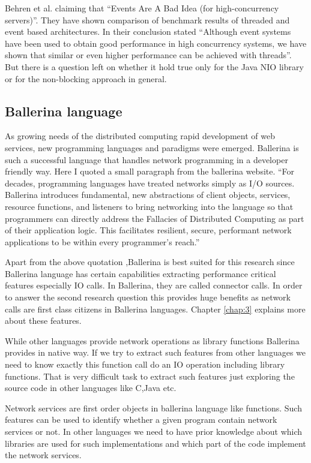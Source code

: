 Behren et al. \cite{events_are_bad} claiming that “Events Are A Bad Idea (for high-concurrency servers)”. They have shown comparison of benchmark results of threaded and event based architectures. In their conclusion stated “Although event systems have been used to obtain good performance in high concurrency systems, we have shown that similar or even higher performance can be achieved with threads”. But there is a question left on whether it hold true only for the Java \acrshort{NIO} library or for the non-blocking approach in general.

\subsection{Ballerina language}

As growing needs of the distributed computing rapid development of web services, new programming
languages and paradigms were emerged. Ballerina \cite{ballerina} is such a successful language that handles
network programming in a developer friendly way. Here I quoted a small paragraph from the ballerina
website.
“For decades, programming languages have treated networks simply as I/O sources. Ballerina
introduces fundamental, new abstractions of client objects, services, resource functions, and listeners
to bring networking into the language so that programmers can directly address the Fallacies \cite{fallacies_of_distributed_computing} of
Distributed Computing as part of their application logic. This facilitates resilient, secure, performant
network applications to be within every programmer’s reach.”

Apart from the above quotation ,Ballerina is best suited for this research since Ballerina language has certain capabilities extracting performance critical features especially IO calls. In Ballerina, they are called connector calls. In order to answer the second research question this provides huge benefits as network calls are first
class citizens in Ballerina languages. Chapter \ref{chap:3} explains more about these features.

While other languages provide network operations as library functions Ballerina provides in native way. If we try to extract such features from other languages we need to know exactly this function call do an IO operation including library functions. That is very difficult task to extract such features just exploring the source code in other languages like C,Java etc.

Network services are first order objects in ballerina language like functions. \cite{ballerina_book} Such features
can be used to identify whether a given program contain network services or not. In other languages we need to have prior knowledge about which libraries are used for such implementations and which part of the code implement the network services.


